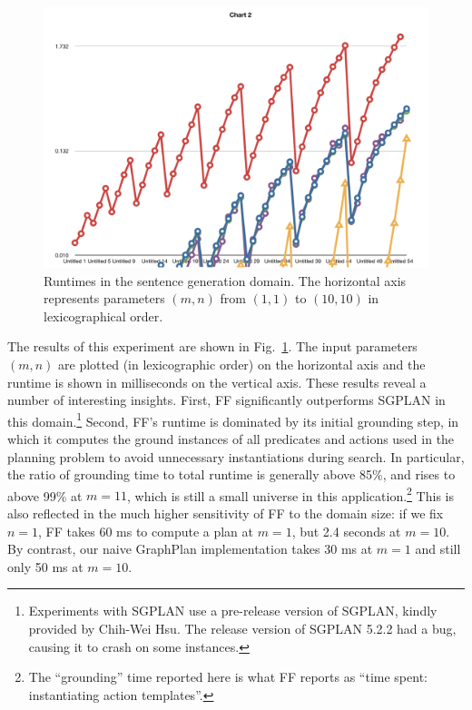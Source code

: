 \begin{figure}
  \centering
  \includegraphics[width=1\columnwidth]{pic-runtime-modifiers-with-sgplan}
  \caption{Runtimes in the sentence generation domain. The horizontal
  axis represents parameters $(m,n)$ from $(1,1)$ to $(10,10)$ in
  lexicographical order.}
  \label{fig:runtimes-crisp}
\end{figure}

The results of this experiment are shown in
Fig.~\ref{fig:runtimes-crisp}. The input parameters $(m,n)$ are plotted
(in lexicographic order) on the horizontal axis and the runtime is shown in
milliseconds on the vertical axis. These results reveal a number of
interesting insights. First, FF significantly outperforms
SGPLAN in this domain.\footnote{Experiments with SGPLAN use a
 pre-release version of SGPLAN, kindly provided by Chih-Wei Hsu. The
 release version of SGPLAN 5.2.2 had a bug, causing it to crash on some
 instances.}
Second, FF's runtime is dominated by its initial grounding step, in which
it computes the ground instances of all predicates and actions used in the
planning problem to avoid unnecessary instantiations during search. In
particular, the ratio of grounding time to total runtime is generally above
85\%, and rises to above 99\% at $m=11$, which is still a small universe in
this application.\footnote{The
  ``grounding'' time reported here is what FF reports as ``time spent:
  instantiating action templates''.}  This is also reflected in the
much higher sensitivity of FF to the domain size: if we fix $n=1$, FF takes
60 ms to compute a plan at $m=1$, but 2.4 seconds at $m=10$. By contrast,
our naive GraphPlan implementation takes 30 ms at $m=1$ and still only 50
ms at $m=10$.

